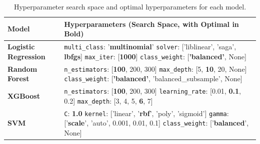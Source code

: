 \documentclass{article}
\begin{document}
\begin{appendices}
\begin{table}[h!]
\begin{tabular}{p{3cm} p{9cm}}
\toprule
\textbf{Model} & \textbf{Hyperparameters (Search Space, with Optimal in Bold)} \\ \midrule

\textbf{Logistic Regression} &
\texttt{multi\_class}: '\textbf{multinomial}' \newline
\texttt{solver}: ['liblinear', 'saga', \textbf{lbfgs}] \newline
\texttt{max\_iter}: [\textbf{1000}] \newline
\texttt{class\_weight}: [\textbf{'balanced'}, None]
\\ \midrule

\textbf{Random Forest} &
\texttt{n\_estimators}: [\textbf{100}, 200, 300] \newline
\texttt{max\_depth}: [5, \textbf{10}, 20, None] \newline
\texttt{class\_weight}: [\textbf{'balanced'}, 'balanced\_subsample', None]
\\ \midrule

\textbf{XGBoost} &
\texttt{n\_estimators}: [\textbf{100}, 200, 300] \newline
\texttt{learning\_rate}: [0.01, \textbf{0.1}, 0.2] \newline
\texttt{max\_depth}: [3, 4, 5, \textbf{6}, 7] 
\\ \midrule

\textbf{SVM} &
\texttt{C}: \textbf{1.0} \newline
\texttt{kernel}: ['linear', '\textbf{rbf}', 'poly', 'sigmoid'] \newline
\texttt{gamma}: ['\textbf{scale}', 'auto', 0.001, 0.01, 0.1] \newline
\texttt{class\_weight}: ['\textbf{balanced}', None]
\\ \bottomrule

\end{tabular}
\centering
\caption{Hyperparameter search space and optimal hyperparameters for each model.}
\label{tab: Hyperparameter_search_space_for_models}
\end{table}

\end{appendices}
\end{document}
